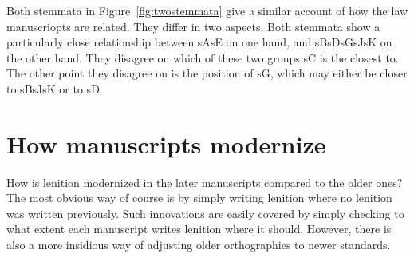 Both stemmata in Figure~\ref{fig:twostemmata} give a similar account of how the law manuscriopts are related. They differ in two aspects. Both stemmata show a particularly close relationship between \gls{sA}\gls{sE} on one hand, and \gls{sB}\gls{sD}\gls{sG}\gls{sJ}\gls{sK} on the other hand. They disagree on which of these two groups \gls{sC} is the closest to. The other point they disagree on is the position of \gls{sG}, which may either be closer to \gls{sB}\gls{sJ}\gls{sK} or to \gls{sD}.
  



\section{How manuscripts modernize}
\label{sec:how-do-manuscripts}

How is lenition modernized in the later manuscripts compared to the older ones?
The most obvious way of course is by simply writing lenition where no lenition was written previously. Such innovations are easily covered by simply checking to what extent each manuscript writes lenition where it should. However, there is also a more insidious way of adjusting older orthographies to newer standards.

